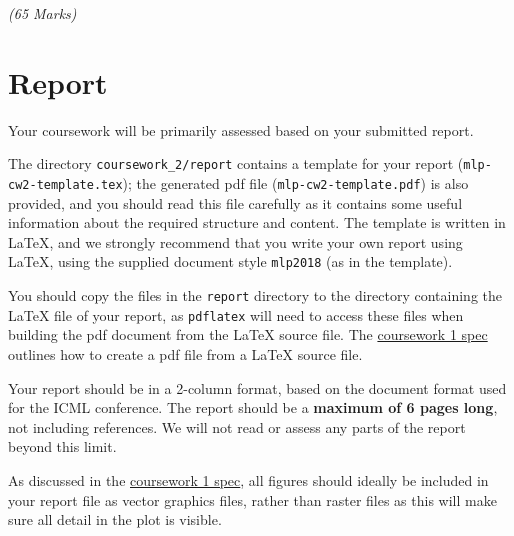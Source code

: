 \documentclass[11pt,]{article}
\def\pagelimit{6\xspace}
\begin{document}
\emph{(65 Marks)}

\section{Report}
\label{sec:report}
Your coursework will be primarily assessed based on your submitted report.

The directory \verb+coursework_2/report+ contains a template for your report (\verb+mlp-cw2-template.tex+);  the generated pdf file (\verb+mlp-cw2-template.pdf+) is also provided, and you should read this file carefully as it contains some useful information about the required structure and content. The template is written in LaTeX, and we strongly recommend that you write your own report using LaTeX, using the supplied document style \verb+mlp2018+ (as in the template).

You should copy the files in the \verb+report+ directory to the directory containing the LaTeX file of your report, as \verb+pdflatex+ will need to access these files when building the pdf document from the LaTeX source file. The  \href{http://www.inf.ed.ac.uk/teaching/courses/mlp/2018-19/mlp_cw1_2018-19.pdf}{coursework 1 spec} outlines how to create a pdf file from a LaTeX source file.

Your report should be in a 2-column format, based on the document format used for the ICML conference. The report should be a \textbf{maximum of \pagelimit pages long}, not including references.  We will not read or assess any parts of the report beyond this limit.

As discussed in the \href{http://www.inf.ed.ac.uk/teaching/courses/mlp/2018-19/mlp_cw1_2018-19.pdf}{coursework 1 spec},  all figures should ideally be included in your report file as vector graphics files, rather than raster files as this will make sure all detail in the plot is visible.
\end{document}
